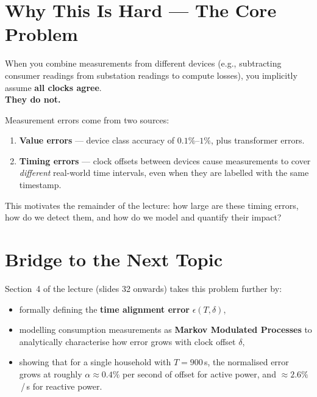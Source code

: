 \section{Why This Is Hard --- The Core Problem}
 
\begin{summarybox}
When you combine measurements from different devices (e.g.,
subtracting consumer readings from substation readings to compute
losses), you implicitly assume \textbf{all clocks agree}.\\[4pt]
\textbf{They do not.}
\end{summarybox}
 
Measurement errors come from two sources:
 
\begin{enumerate}[leftmargin=2em, itemsep=4pt]
  \item \textbf{Value errors} --- device class accuracy of
        $0.1\%$--$1\%$, plus transformer errors.
  \item \textbf{Timing errors} --- clock offsets between devices
        cause measurements to cover \emph{different} real-world
        time intervals, even when they are labelled with the same
        timestamp.
\end{enumerate}
 
This motivates the remainder of the lecture: how large are these
timing errors, how do we detect them, and how do we model and
quantify their impact?
 
\section{Bridge to the Next Topic}
 
Section~4 of the lecture (slides 32 onwards) takes this problem
further by:
\begin{itemize}[itemsep=3pt]
  \item formally defining the \textbf{time alignment error}
        $\epsilon(T, \delta)$,
  \item modelling consumption measurements as
        \textbf{Markov Modulated Processes} to analytically
        characterise how error grows with clock offset $\delta$,
  \item showing that for a single household with $T=900$\,s,
        the normalised error grows at roughly
        $\alpha \approx 0.4\%$ per second of offset for active
        power, and $\approx 2.6\%$\,/\,s for reactive power.
\end{itemize}
 
